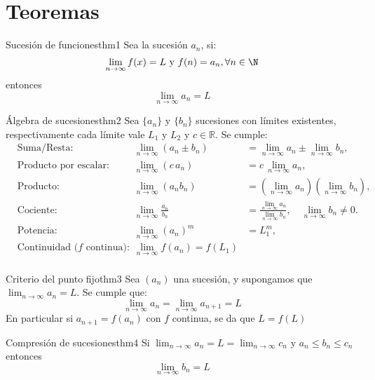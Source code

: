 \documentclass[12pt,a4paper]{article}
\begin{document}
\section{Teoremas}

\begin{teorema}{Sucesión de funciones}{thm1}
    Sea la sucesión $a_n$, si:
    \[ 
        \lim_{n \to \infty} f(x) = L \text{ y } f(n) = a_n, \forall n \in \N
    \]
    entonces
    \[ 
        \lim_{n \to \infty} a_n = L
    \]
\end{teorema}

\begin{teorema}{Álgebra de sucesiones}{thm2}
    Sea $\{a_n\}$ y $\{b_n\}$ sucesiones con límites existentes, respectivamente cada límite vale $L_1$ y $L_2$ y $c\in\mathbb{R}$. Se cumple:
    \[
    \begin{aligned}
    &\text{Suma/Resta:} & \lim_{n \to \infty} (a_n \pm b_n) &= \lim_{n \to \infty} a_n \pm \lim_{n \to \infty} b_n,\\
    &\text{Producto por escalar:} & \lim_{n \to \infty} (c\,a_n) &= c\,\lim_{n \to \infty} a_n,\\
    &\text{Producto:} & \lim_{n \to \infty} (a_n b_n) &= (\lim_{n \to \infty} a_n)(\lim_{n \to \infty} b_n),\\
    &\text{Cociente:} & \lim_{n \to \infty} \frac{a_n}{b_n} &= \frac{\lim\limits_{n \to \infty} a_n}{\lim\limits_{n \to \infty} b_n}, \quad \lim_{n\to\infty} b_n \neq 0. \\
    &\text{Potencia:} & \lim_{n \to \infty} (a_n)^m &= L_1^m,\\
    &\text{Continuidad ($f$ continua): } & \lim_{n \to \infty}f(a_n) = f(L_1) \\
    \end{aligned}
    \]
\end{teorema}

\begin{teorema}{Criterio del punto fijo}{thm3}
    Sea $(a_n)$ una sucesión, y supongamos que $\lim_{n \to \infty} a_n = L$. Se cumple que:
    \[ 
        \lim_{n \to \infty} a_n = \lim_{n \to \infty} a_{n + 1} = L
    \]
    En particular si $a_{n + 1} = f(a_n)$ con $f$ continua, se da que $L = f(L)$
\end{teorema}

\begin{teorema}{Compresión de sucesiones}{thm4}
    Si $\lim_{n \to \infty} a_n = L = \lim_{n \to \infty} c_n$ y $a_n \leq b_n \leq c_n$ entonces
    \[ 
        \lim_{n \to \infty} b_n = L
    \]
\end{teorema}

\end{document}
